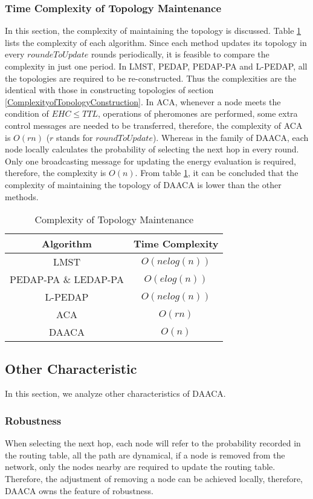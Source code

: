 \documentclass{elsarticle}
\begin{document}
\subsubsection{Time Complexity of Topology Maintenance} \label{ComplexityOfTopologyMaintenance}
In this section, the complexity of maintaining the topology is discussed. Table \ref{ComplexityOfTopologyMaintenanceTable} lists the complexity of each algorithm. Since each method updates its topology in every $roundeToUpdate$ rounds periodically, it is feasible to compare the complexity in just one period. In LMST, PEDAP, PEDAP-PA and L-PEDAP, all the topologies are required to be re-constructed. Thus the complexities are the identical with those in constructing topologies of section \ref{ComplexityofTopologyConstruction}. In ACA, whenever a node meets the condition of $EHC \leq TTL$, operations of pheromones are performed, some extra control messages \cite{label-10} are needed to be transferred, therefore, the complexity of ACA is $O(rn)$ ($r$ stands for $roundToUpdate$). Whereas in the family of DAACA, each node locally calculates the probability of selecting the next hop in every round. Only one broadcasting message for updating the energy evaluation is required, therefore, the complexity is $O(n)$. From table \ref{ComplexityOfTopologyMaintenanceTable}, it can be concluded that the complexity of maintaining the topology of DAACA is lower than the other methods.

\begin{table}[!hbp]
\centering
\caption{Complexity of Topology Maintenance} \label{ComplexityOfTopologyMaintenanceTable}
\begin{tabular}{cc}
\toprule
\textbf{Algorithm} & \textbf{Time Complexity} \\
\midrule
LMST & $O(nelog(n))$ \\
PEDAP-PA \& LEDAP-PA & $O(elog(n))$ \\
L-PEDAP & $O(nelog(n))$ \\
ACA & $O(rn)$ \\
DAACA & $O(n)$ \\
\bottomrule
\end{tabular}

\end{table}


\subsection{Other Characteristic}
In this section, we analyze other characteristics of DAACA.
\subsubsection{Robustness} \label{roubustness}
When selecting the next hop, each node will refer to the probability recorded in the routing table, all the path are dynamical, if a node is removed from the network, only the nodes nearby are required to update the routing table. Therefore, the adjustment of removing a node can be achieved locally, therefore, DAACA owns the feature of robustness.
\end{document}
